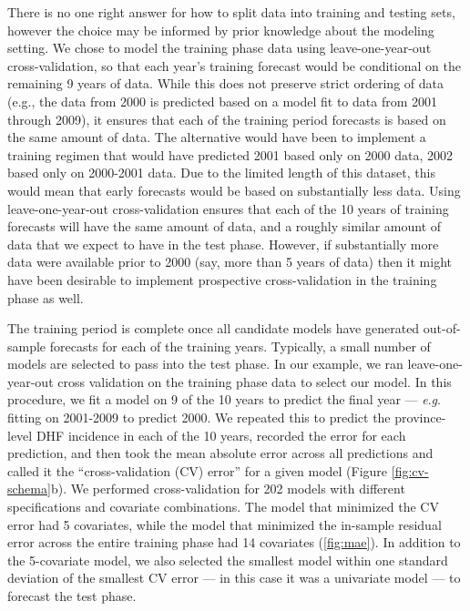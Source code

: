 \documentclass[a4paper]{article}
\newcommand{\eg}{\textit{e}.\textit{g}. }
\begin{document}
There is no one right answer for how to split data into training and testing sets, however the choice may be informed by prior knowledge about the modeling setting.
We chose to model the training phase data using leave-one-year-out cross-validation, so that each year's training forecast would be conditional on the remaining 9 years of data. 
While this does not preserve strict ordering of data (e.g., the data from 2000 is predicted based on a model fit to data from 2001 through 2009), it ensures that each of the training period forecasts is based on the same amount of data.
The alternative would have been to implement a training regimen that would have predicted 2001 based only on 2000 data, 2002 based only on 2000-2001 data. 
Due to the limited length of this dataset, this would mean that early forecasts would be based on substantially less data.
Using leave-one-year-out cross-validation ensures that each of the 10 years of training forecasts will have the same amount of data, and a roughly similar amount of data that we expect to have in the test phase.
However, if substantially more data were available prior to 2000 (say, more than 5 years of data) then it might have been desirable to implement prospective cross-validation in the training phase as well.

The training period is complete once all candidate models have generated out-of-sample forecasts for each of the training years.
Typically, a small number of models are selected to pass into the test phase.
In our example, we ran leave-one-year-out cross validation on the training phase data to select our model.
In this procedure, we fit a model on 9 of the 10 years to predict the final year --- \eg fitting on 2001-2009 to predict 2000.
We repeated this to predict the province-level DHF incidence in each of the 10 years, recorded the error for each prediction, and then took the mean absolute error across all predictions and called it the ``cross-validation (CV) error'' for a given model  (Figure \ref{fig:cv-schema}b).
We performed cross-validation for 202 models with different specifications and covariate combinations.
The model that minimized the CV error had 5 covariates, while the model that minimized the in-sample residual error across the entire training phase had 14 covariates (\autoref{fig:mae}).
In addition to the 5-covariate model, we also selected the smallest model within one standard deviation of the smallest CV error --- in this case it was a univariate model --- to forecast the test phase.
\end{document}
